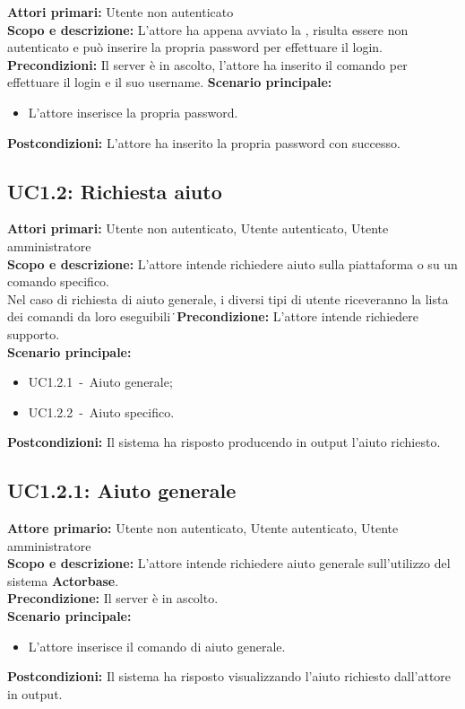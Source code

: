 \documentclass{scalatekids-article}
\begin{document}
\textbf{Attori primari:} Utente non autenticato\\
\textbf{Scopo e descrizione:}
L'attore ha appena avviato la , risulta essere non autenticato e può inserire la propria password per effettuare il login.\\
\textbf{Precondizioni:} Il server è in ascolto, l'attore ha inserito il comando per effettuare il login e il suo username.
\textbf{Scenario principale:}
\begin{itemize}
\item L'attore inserisce la propria password.
\end{itemize}
\textbf{Postcondizioni:} L'attore ha inserito la propria password con successo.

\subsection{UC1.2: Richiesta aiuto}

\textbf{Attori primari:} Utente non autenticato, Utente autenticato, Utente amministratore\\
\textbf{Scopo e descrizione:} L'attore intende richiedere aiuto sulla piattaforma o su un comando specifico.\\Nel caso di richiesta di aiuto generale, i diversi tipi di utente riceveranno la lista dei comandi da loro eseguibili\.\
\textbf{Precondizione:} L'attore intende richiedere supporto.\\
\textbf{Scenario principale:}
\begin{itemize}
\item UC1.2.1\ -\ Aiuto generale;
\item UC1.2.2\ -\ Aiuto specifico.
\end{itemize}
\textbf{Postcondizioni:} Il sistema ha risposto producendo in output l'aiuto richiesto.

\subsection{UC1.2.1: Aiuto generale}

\textbf{Attore primario:} Utente non autenticato, Utente autenticato, Utente amministratore\\
\textbf{Scopo e descrizione:} L'attore intende richiedere aiuto generale sull'utilizzo del sistema \textbf{Actorbase}.\\
\textbf{Precondizione:} Il server è in ascolto.\\
\textbf{Scenario principale:}
\begin{itemize}
\item L'attore inserisce il comando di aiuto generale. %
\end{itemize}
\textbf{Postcondizioni:} Il sistema ha risposto visualizzando l'aiuto richiesto dall'attore in output.
\end{document}
